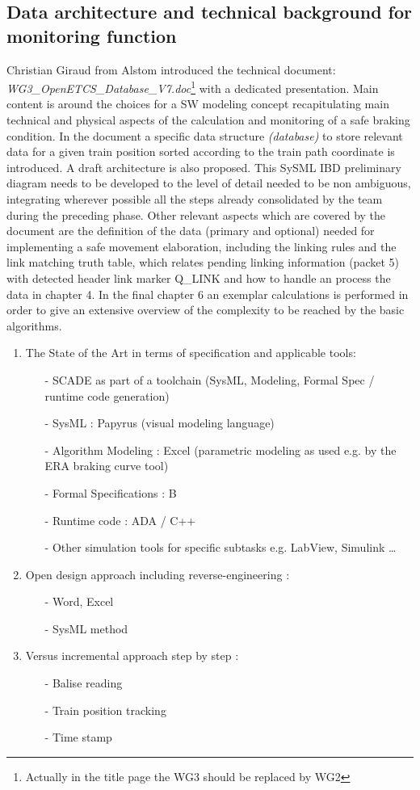 \documentclass{template/openetcs_report}
\begin{document}
\subsection{Data architecture and technical background for monitoring function}
Christian Giraud from Alstom introduced the technical document: \emph{WG3\_OpenETCS\_Database\_V7.doc}\footnote{Actually in the title page the WG3 should be replaced by WG2} with a dedicated presentation. Main content is around the choices for a SW modeling concept recapitulating main technical and physical aspects of the calculation and monitoring of a safe braking condition. In the document a specific data structure \emph{(database)} to store relevant data for a given train position sorted according to the train path coordinate is introduced. A draft architecture is also proposed. This SySML IBD preliminary diagram needs to be developed to the level of detail needed to be non ambiguous, integrating wherever possible all the steps already consolidated by the team during the preceding phase. Other relevant aspects which are covered by the document are the definition of the data (primary and optional) needed for implementing a safe movement elaboration, including the linking rules and the link matching truth table, which relates pending linking information (packet 5) with detected header link marker Q\_LINK and how to handle an process the data in chapter 4. In the final chapter 6 an exemplar calculations is performed in order to give an extensive overview of the complexity to be reached by the basic algorithms.

\begin{enumerate}
\item The State of the Art in terms of specification and applicable tools:
\begin{itemize}
\item[-] SCADE as part of a toolchain (SysML, Modeling, Formal Spec / runtime code generation)
\item[-] SysML  : Papyrus (visual modeling language)
\item[-] Algorithm Modeling : Excel (parametric modeling as used e.g. by the ERA braking curve tool)
\item[-] Formal Specifications : B 
\item[-] Runtime code : ADA / C++
\item[-] Other simulation tools for specific subtasks e.g. LabView, Simulink \ldots
\end{itemize}
\item Open design approach including reverse-engineering :
\begin{itemize}
\item[-] Word, Excel
\item[-] SysML method
\end{itemize}
\item Versus incremental approach step by step :
\begin{itemize}
\item[-]Balise reading
\item[-]Train position tracking
\item[-]Time stamp
\end{itemize}
\end{enumerate}
\end{document}
